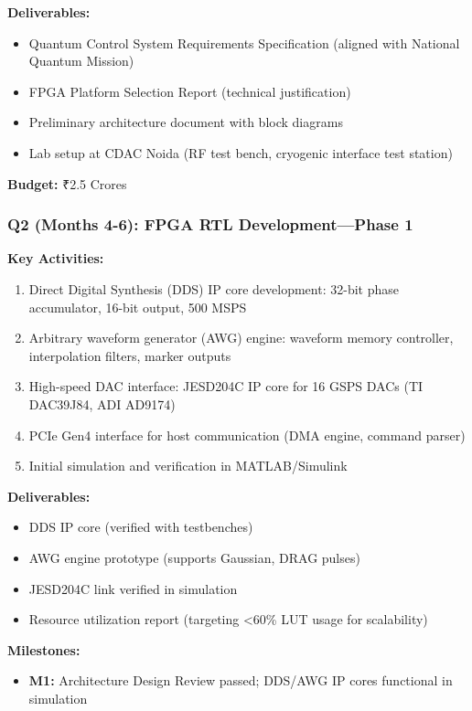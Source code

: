 \documentclass[12pt,a4paper]{article}
\begin{document}
\textbf{Deliverables:}
\begin{itemize}[leftmargin=*]
    \item Quantum Control System Requirements Specification (aligned with National Quantum Mission)
    \item FPGA Platform Selection Report (technical justification)
    \item Preliminary architecture document with block diagrams
    \item Lab setup at CDAC Noida (RF test bench, cryogenic interface test station)
\end{itemize}

\textbf{Budget:} ₹2.5 Crores

\subsubsection{Q2 (Months 4-6): FPGA RTL Development—Phase 1}

\textbf{Key Activities:}
\begin{enumerate}[leftmargin=*]
    \item Direct Digital Synthesis (DDS) IP core development: 32-bit phase accumulator, 16-bit output, 500 MSPS
    \item Arbitrary waveform generator (AWG) engine: waveform memory controller, interpolation filters, marker outputs
    \item High-speed DAC interface: JESD204C IP core for 16 GSPS DACs (TI DAC39J84, ADI AD9174)
    \item PCIe Gen4 interface for host communication (DMA engine, command parser)
    \item Initial simulation and verification in MATLAB/Simulink
\end{enumerate}

\textbf{Deliverables:}
\begin{itemize}[leftmargin=*]
    \item DDS IP core (verified with testbenches)
    \item AWG engine prototype (supports Gaussian, DRAG pulses)
    \item JESD204C link verified in simulation
    \item Resource utilization report (targeting <60\% LUT usage for scalability)
\end{itemize}

\textbf{Milestones:}
\begin{itemize}[leftmargin=*]
    \item \textbf{M1:} Architecture Design Review passed; DDS/AWG IP cores functional in simulation
\end{itemize}
\end{document}
